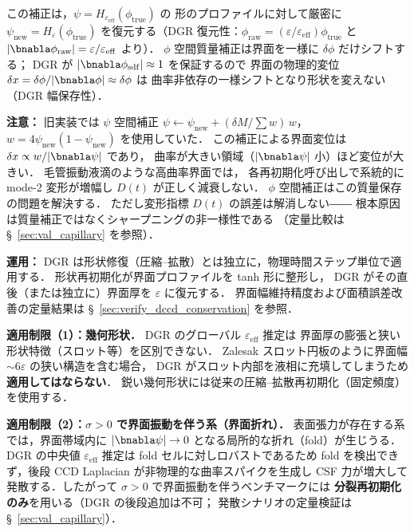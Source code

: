 この補正は，$\psi = H_{\varepsilon_{\mathrm{eff}}}(\phi_{\mathrm{true}})$ の
形のプロファイルに対して厳密に $\psi_{\mathrm{new}} = H_\varepsilon(\phi_{\mathrm{true}})$
を復元する（DGR 復元性：$\phi_{\mathrm{raw}} = (\varepsilon/\varepsilon_{\mathrm{eff}})\phi_{\mathrm{true}}$ と
$|\bnabla\phi_{\mathrm{raw}}| = \varepsilon/\varepsilon_{\mathrm{eff}}$ より）．
$\phi$ 空間質量補正は界面を一様に $\delta\phi$ だけシフトする；
DGR が $|\bnabla\phi_{\mathrm{sdf}}| \approx 1$ を保証するので
界面の物理的変位 $\delta x = \delta\phi / |\bnabla\phi| \approx \delta\phi$ は
曲率非依存の一様シフトとなり形状を変えない（DGR 幅保存性）．

\textbf{注意：} 旧実装では $\psi$ 空間補正
$\psi \leftarrow \psi_{\mathrm{new}} + (\delta M / \sum w)\,w$，
$w = 4\psi_{\mathrm{new}}(1-\psi_{\mathrm{new}})$ を使用していた．
この補正による界面変位は $\delta x \propto w/|\bnabla\psi|$ であり，
曲率が大きい領域（$|\bnabla\psi|$ 小）ほど変位が大きい．
毛管振動液滴のような高曲率界面では，
各再初期化呼び出しで系統的に mode-2 変形が増幅し $D(t)$ が正しく減衰しない．
$\phi$ 空間補正はこの質量保存の問題を解決する．
ただし変形指標 $D(t)$ の誤差は解消しない――
根本原因は質量補正ではなくシャープニングの非一様性である
（定量比較は §~\ref{sec:val_capillary} を参照）．

\textbf{運用：}
DGR は形状修復（圧縮--拡散）とは独立に，物理時間ステップ単位で適用する．
形状再初期化が界面プロファイルを tanh 形に整形し，
DGR がその直後（または独立に）界面厚を $\varepsilon$ に復元する．
界面幅維持精度および面積誤差改善の定量結果は
§~\ref{sec:verify_dccd_conservation} を参照．

\textbf{適用制限（1）：幾何形状．}
DGR のグローバル $\varepsilon_{\mathrm{eff}}$ 推定は
界面厚の膨張と狭い形状特徴（スロット等）を区別できない．
Zalesak スロット円板のように界面幅 $\sim 6\varepsilon$ の狭い構造を含む場合，
DGR がスロット内部を液相に充填してしまうため\textbf{適用してはならない}．
鋭い幾何形状には従来の圧縮--拡散再初期化（固定頻度）を使用する．

\textbf{適用制限（2）：$\sigma > 0$ で界面振動を伴う系（界面折れ）．}
表面張力が存在する系では，界面帯域内に
$|\bnabla\psi| \to 0$ となる局所的な折れ（fold）が生じうる．
DGR の中央値 $\varepsilon_{\mathrm{eff}}$ 推定は fold セルに対しロバストであるため
fold を検出できず，後段 CCD Laplacian が非物理的な曲率スパイクを生成し
CSF 力が増大して発散する．したがって $\sigma>0$ で界面振動を伴うベンチマークには
\textbf{分裂再初期化のみ}を用いる（DGR の後段追加は不可；
発散シナリオの定量検証は §~\ref{sec:val_capillary}）．


